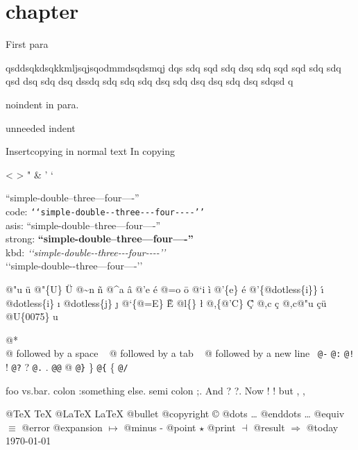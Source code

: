 \documentclass{book}
\newcommand\GNUTexinfocommandstyletextkbd[1]{{\ttfamily\textsl{#1}}}%
\begin{document}
\label{anchor:Top}%
\chapter{{chapter}}
\label{anchor:chapter}%

First para

\noindent{}qsddsqkdsqkkmljsqjsqodmmdsqdsmqj dqs sdq sqd sdq dsq sdq sqd sqd sdq sdq 
qsd dsq sdq dsq dssdq sdq sdq sdq dsq sdq dsq dsq sdq dsq sdqsd q

\noindent{}noindent in para.

unneeded indent

Insertcopying in normal text
In copying

<
>
"
\&
'
`

``simple-double--three---four----''\leavevmode{}\\
code: \texttt{{`}{`}simple-double{-}{-}three{-}{-}{-}four{-}{-}{-}-{'}{'}} \leavevmode{}\\
asis: ``simple-double--three---four----'' \leavevmode{}\\
strong: \textbf{``simple-double--three---four----''} \leavevmode{}\\
kbd: \GNUTexinfocommandstyletextkbd{{`}{`}simple-double{-}{-}three{-}{-}{-}four{-}{-}{-}-{'}{'}} \leavevmode{}\\

`\hbox{}`simple-double-\hbox{}-three---four----'\hbox{}'\leavevmode{}\\

%
%
%
%

@"u \"{u} 
@"\{U\} \"{U} 
@\~{}n \~{n}
@\^{}a \^{a}
@'e \'{e}
@=o \={o}
@`i \`{i}
@'\{e\} \'{e}
@'\{@dotless\{i\}\} \'{\i{}} 
@dotless\{i\} \i{}
@dotless\{j\} \j{}
@`\{@=E\} \`{\={E}} 
@l\{\} \l{}
@,\{@'C\} \c{\'{C}}
@,c \c{c}
@,c@"u \c{c}\"{u} \leavevmode{}\\

@U\{0075\} u

@* \leavevmode{}\\
@ followed by a space
\ {}
@ followed by a tab
\ {}
@ followed by a new line
\ {}\texttt{@-} \-{}
\texttt{@:} \@
\texttt{@!} \@!
\texttt{@?} \@?
\texttt{@.} \@.
\texttt{@@} @
\texttt{@\}} \}
\texttt{@\{} \{
\texttt{@/} 

foo vs.\@ bar. 
colon :\@And something else.
semi colon ;\@.
And ? ?\@.
Now ! !\@@
but , ,\@

@TeX \TeX{}
@LaTeX \LaTeX{}
@bullet \textbullet{}
@copyright \copyright{}
@dots \dots{}\@
@enddots \dots{}
@equiv $\equiv{}$
@error 
@expansion $\mapsto{}$
@minus -
@point $\star{}$
@print $\dashv{}$
@result $\Rightarrow{}$
@today \today{}
\end{document}
